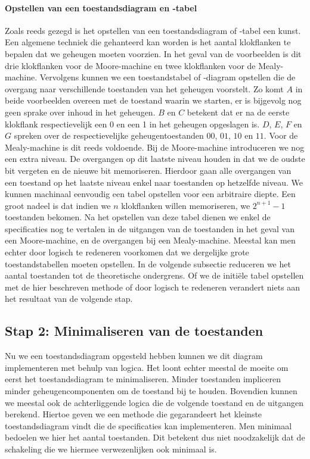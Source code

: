 \paragraph{Opstellen van een toestandsdiagram en -tabel}Zoals reeds gezegd is het opstellen van een toestandsdiagram of -tabel een kunst. Een algemene techniek die gehanteerd kan worden is het aantal klokflanken te bepalen dat we geheugen moeten voorzien.  In het geval van de voorbeelden is dit drie klokflanken voor de Moore-machine en twee klokflanken voor de Mealy-machine. Vervolgens kunnen we een toestandstabel of -diagram opstellen die de overgang naar verschillende toestanden van het geheugen voorstelt. Zo komt $A$ in beide voorbeelden overeen met de toestand waarin we starten, er is bijgevolg nog geen sprake over inhoud in het geheugen. $B$ en $C$ betekent dat er na de eerste klokflank respectievelijk een 0 en een 1 in het geheugen opgeslagen is. $D$, $E$, $F$ en $G$ spreken over de respectievelijke geheugentoestanden $00$, $01$, $10$ en $11$. Voor de Mealy-machine is dit reeds voldoende. Bij de Moore-machine introduceren we nog een extra niveau. De overgangen op dit laatste niveau houden in dat we de oudste bit vergeten en de nieuwe bit memoriseren. Hierdoor gaan alle overgangen van een toestand op het laatste niveau enkel naar toestanden op hetzelfde niveau. We kunnen machinaal eenvoudig een tabel opstellen voor een arbitraire diepte. Een groot nadeel is dat indien we $n$ klokflanken willen memoriseren, we $2^{n+1}-1$ toestanden bekomen. Na het opstellen van deze tabel dienen we enkel de specificaties nog te vertalen in de uitgangen van de toestanden in het geval van een Moore-machine, en de overgangen bij een Mealy-machine. Meestal kan men echter door logisch te redeneren voorkomen dat we dergelijke grote toestandstabellen moeten opstellen. In de volgende subsectie reduceren we het aantal toestanden tot de theoretische ondergrens. Of we de initi\"ele tabel opstellen met de hier beschreven methode of door logisch te redeneren verandert niets aan het resultaat van de volgende stap.
\subsection{Stap 2: Minimaliseren van de toestanden}
Nu we een toestandsdiagram opgesteld hebben kunnen we dit diagram implementeren met behulp van logica. Het loont echter meestal de moeite om eerst het toestandsdiagram te minimaliseren. Minder toestanden impliceren minder geheugencomponenten om de toestand bij te houden. Bovendien kunnen we meestal ook de achterliggende logica die de volgende toestand en de uitgangen berekend. Hiertoe geven we een methode die gegarandeert het kleinste toestandsdiagram vindt die de specificaties kan implementeren. Men minimaal bedoelen we hier het aantal toestanden. Dit betekent dus niet noodzakelijk dat de schakeling die we hiermee verwezenlijken ook minimaal is.
